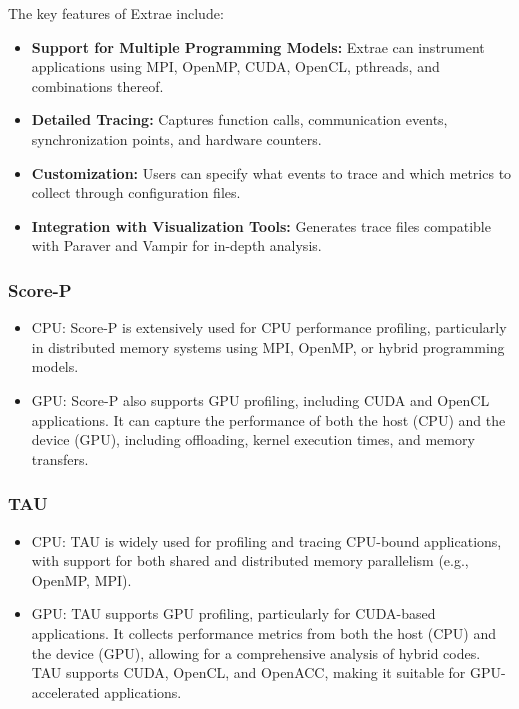 The key features of Extrae include:

\begin{itemize}
  \item \textbf{Support for Multiple Programming Models:} Extrae can instrument applications using MPI, OpenMP, CUDA, OpenCL, pthreads, and combinations thereof.
  \item \textbf{Detailed Tracing:} Captures function calls, communication events, synchronization points, and hardware counters.
  \item \textbf{Customization:} Users can specify what events to trace and which metrics to collect through configuration files.
  \item \textbf{Integration with Visualization Tools:} Generates trace files compatible with Paraver and Vampir for in-depth analysis.
\end{itemize}


\subsubsection{Score-P}
\label{sec:methodology-tools-scorep}

\begin{itemize}
    \item CPU: Score-P is extensively used for CPU performance profiling, particularly in distributed memory systems using MPI, OpenMP, or hybrid programming models.
    \item GPU: Score-P also supports GPU profiling, including CUDA and OpenCL applications. It can capture the performance of both the host (CPU) and the device (GPU), including offloading, kernel execution times, and memory transfers.
\end{itemize}


\subsubsection{TAU}
\label{sec:methodology-tools-tau}

\begin{itemize}
    \item CPU: TAU is widely used for profiling and tracing CPU-bound applications, with support for both shared and distributed memory parallelism (e.g., OpenMP, MPI).
    \item GPU: TAU supports GPU profiling, particularly for CUDA-based applications. It collects performance metrics from both the host (CPU) and the device (GPU), allowing for a comprehensive analysis of hybrid codes. TAU supports CUDA, OpenCL, and OpenACC, making it suitable for GPU-accelerated applications.
\end{itemize}


